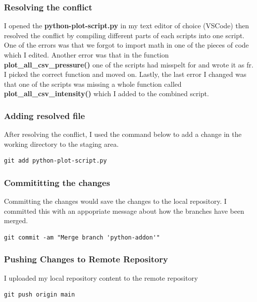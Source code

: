 \documentclass[]{article}
\begin{document}
\subsubsection{Resolving the conflict}
I opened the \textbf{python-plot-script.py} in my text editor of choice (VSCode) then resolved the conflict by compiling different
parts of each scripts into one script. One of the errors was that we forgot to import math in one of the pieces of code
which I edited. Another error was that in the function \textbf{plot\_all\_csv\_pressure()} one of the scripts had misspelt for and
wrote it as fr. I picked the correct function and moved on. Lastly, the last error I changed was that one of the scripts
was missing a whole function called \textbf{plot\_all\_csv\_intensity()} which I added to the combined script.
\subsubsection{Adding resolved file}
After resolving the conflict, I used the command below to add a change in the working directory to the staging area.
\begin{tcolorbox}[colback=white, colframe=black, boxrule=0.5pt, arc=2mm, 
    fonttitle=\bfseries, listing only, listing options={language=sh, basicstyle=\ttfamily}]
\begin{verbatim}
git add python-plot-script.py
\end{verbatim}
\end{tcolorbox}
\subsubsection{Commititting the changes}
Committing the changes would save the changes to the local repository. I committed this with an appopriate message about how the
branches have been merged.
\begin{tcolorbox}[colback=white, colframe=black, boxrule=0.5pt, arc=2mm, 
    fonttitle=\bfseries, listing only, listing options={language=sh, basicstyle=\ttfamily}]
\begin{verbatim}
git commit -am "Merge branch 'python-addon'"
\end{verbatim}
\end{tcolorbox}
\subsubsection{Pushing Changes to Remote Repository}
I uploaded my local repository content to the remote repository 
\begin{tcolorbox}[colback=white, colframe=black, boxrule=0.5pt, arc=2mm, 
    fonttitle=\bfseries, listing only, listing options={language=sh, basicstyle=\ttfamily}]
\begin{verbatim}
git push origin main
\end{verbatim}
\end{tcolorbox}
\end{document}
